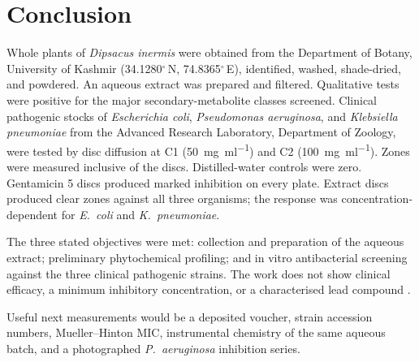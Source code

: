 
\chapter{Conclusion}
\label{ch:conclusion}

Whole plants of \textit{Dipsacus inermis} were obtained from the Department of Botany, University of Kashmir (34.1280$^{\circ}$\,N, 74.8365$^{\circ}$\,E), identified, washed, shade-dried, and powdered. An aqueous extract was prepared and filtered. Qualitative tests were positive for the major secondary-metabolite classes screened. Clinical pathogenic stocks of \textit{Escherichia coli}, \textit{Pseudomonas aeruginosa}, and \textit{Klebsiella pneumoniae} from the Advanced Research Laboratory, Department of Zoology, were tested by disc diffusion at C1 (\qty{50}{\milli\gram\per\milli\litre}) and C2 (\qty{100}{\milli\gram\per\milli\litre}). Zones were measured inclusive of the discs. Distilled-water controls were zero. Gentamicin 5 discs produced marked inhibition on every plate. Extract discs produced clear zones against all three organisms; the response was concentration-dependent for \textit{E.\ coli} and \textit{K.\ pneumoniae}.

The three stated objectives were met: collection and preparation of the aqueous extract; preliminary phytochemical profiling; and in vitro antibacterial screening against the three clinical pathogenic strains. The work does not show clinical efficacy, a minimum inhibitory concentration, or a characterised lead compound \citep{vanvuuren2019,balouiri2016}.

Useful next measurements would be a deposited voucher, strain accession numbers, Mueller--Hinton MIC, instrumental chemistry of the same aqueous batch, and a photographed \textit{P.\ aeruginosa} inhibition series.
